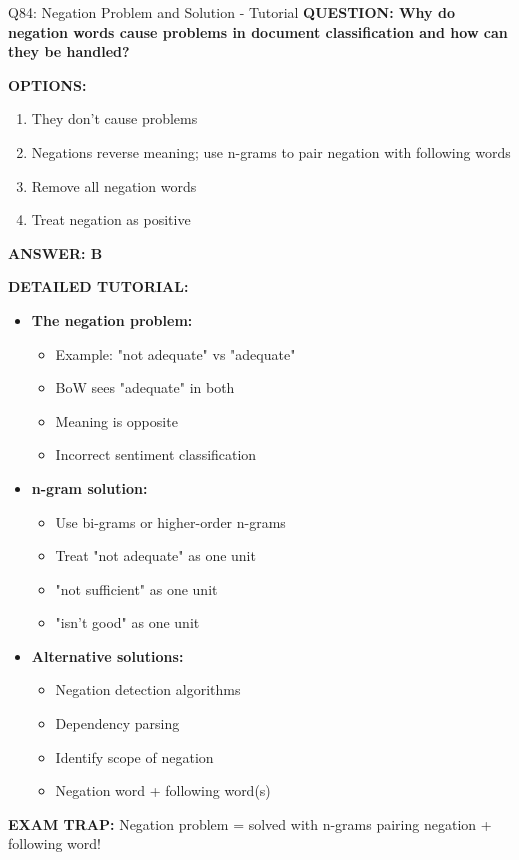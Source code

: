 \documentclass[8pt]{beamer}
\begin{document}
	\begin{frame}{Q84: Negation Problem and Solution - Tutorial}
		\fontsize{6.5}{7.5}\selectfont
		\textbf{QUESTION: Why do negation words cause problems in document classification and how can they be handled?}
		
		\vspace{0.1cm}
		\textbf{OPTIONS:}
		\begin{enumerate}
			\item They don't cause problems
			\item Negations reverse meaning; use n-grams to pair negation with following words
			\item Remove all negation words
			\item Treat negation as positive
		\end{enumerate}
		
		\vspace{0.1cm}
		\textcolor{myblue}{\textbf{ANSWER: B}}
		
		\vspace{0.1cm}
		\textbf{DETAILED TUTORIAL:}
		\begin{itemize}
			\item \textbf{The negation problem:}
			\begin{itemize}
				\item Example: "not adequate" vs "adequate"
				\item BoW sees "adequate" in both
				\item Meaning is opposite
				\item Incorrect sentiment classification
			\end{itemize}
			\item \textbf{n-gram solution:}
			\begin{itemize}
				\item Use bi-grams or higher-order n-grams
				\item Treat "not adequate" as one unit
				\item "not sufficient" as one unit
				\item "isn't good" as one unit
			\end{itemize}
			\item \textbf{Alternative solutions:}
			\begin{itemize}
				\item Negation detection algorithms
				\item Dependency parsing
				\item Identify scope of negation
				\item Negation word + following word(s)
			\end{itemize}
		\end{itemize}
		
		\textcolor{myred}{\textbf{EXAM TRAP:}} Negation problem = \textcolor{myblue}{solved with n-grams} pairing negation + following word!
	\end{frame}
	
\end{document}
